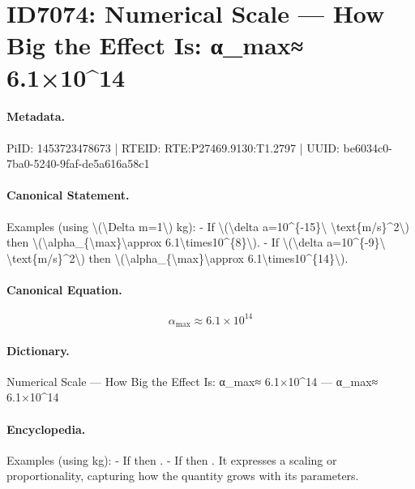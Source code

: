 \section*{ID7074: Numerical Scale — How Big the Effect Is: α\_max≈ 6.1×10\textasciicircum{}14}
\paragraph{Metadata.}
PiID: 1453723478673 | RTEID: RTE:P27469.9130:T1.2797 | UUID: be6034c0-7ba0-5240-9faf-de5a616a58c1

\paragraph{Canonical Statement.}
Examples (using \textbackslash{}(\textbackslash{}Delta m=1\textbackslash{}) kg): - If \textbackslash{}(\textbackslash{}delta a=10\textasciicircum{}\{-15\}\textbackslash{} \textbackslash{}text\{m/s\}\textasciicircum{}2\textbackslash{}) then \textbackslash{}(\textbackslash{}alpha\_\{\textbackslash{}max\}\textbackslash{}approx 6.1\textbackslash{}times10\textasciicircum{}\{8\}\textbackslash{}). - If \textbackslash{}(\textbackslash{}delta a=10\textasciicircum{}\{-9\}\textbackslash{} \textbackslash{}text\{m/s\}\textasciicircum{}2\textbackslash{}) then \textbackslash{}(\textbackslash{}alpha\_\{\textbackslash{}max\}\textbackslash{}approx 6.1\textbackslash{}times10\textasciicircum{}\{14\}\textbackslash{}).

\paragraph{Canonical Equation.}
\[
\alpha_{\max}\approx 6.1\times10^{14}
\]

\paragraph{Dictionary.}
Numerical Scale — How Big the Effect Is: α\_max≈ 6.1×10\textasciicircum{}14 — α\_max≈ 6.1×10\textasciicircum{}14

\paragraph{Encyclopedia.}
Examples (using kg): - If then . - If then . It expresses a scaling or proportionality, capturing how the quantity grows with its parameters.
